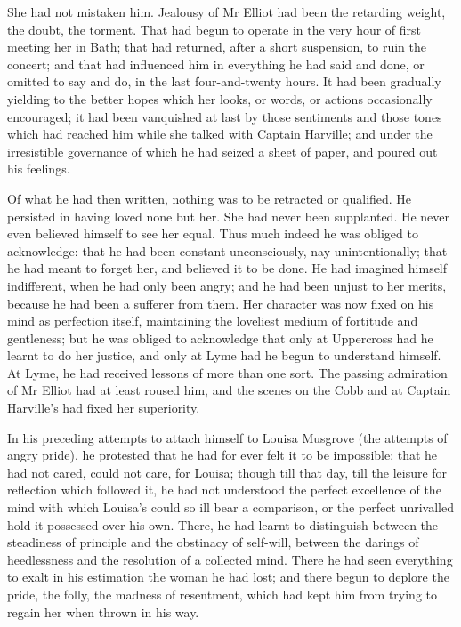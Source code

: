 She had not mistaken him. Jealousy of Mr Elliot had been the retarding weight, the doubt, the torment. That had begun to operate in the very hour of first meeting her in Bath; that had returned, after a short suspension, to ruin the concert; and that had influenced him in everything he had said and done, or omitted to say and do, in the last four-and-twenty hours. It had been gradually yielding to the better hopes which her looks, or words, or actions occasionally encouraged; it had been vanquished at last by those sentiments and those tones which had reached him while she talked with Captain Harville; and under the irresistible governance of which he had seized a sheet of paper, and poured out his feelings.

Of what he had then written, nothing was to be retracted or qualified. He persisted in having loved none but her. She had never been supplanted. He never even believed himself to see her equal. Thus much indeed he was obliged to acknowledge: that he had been constant unconsciously, nay unintentionally; that he had meant to forget her, and believed it to be done. He had imagined himself indifferent, when he had only been angry; and he had been unjust to her merits, because he had been a sufferer from them. Her character was now fixed on his mind as perfection itself, maintaining the loveliest medium of fortitude and gentleness; but he was obliged to acknowledge that only at Uppercross had he learnt to do her justice, and only at Lyme had he begun to understand himself. At Lyme, he had received lessons of more than one sort. The passing admiration of Mr Elliot had at least roused him, and the scenes on the Cobb and at Captain Harville's had fixed her superiority.

In his preceding attempts to attach himself to Louisa Musgrove (the attempts of angry pride), he protested that he had for ever felt it to be impossible; that he had not cared, could not care, for Louisa; though till that day, till the leisure for reflection which followed it, he had not understood the perfect excellence of the mind with which Louisa's could so ill bear a comparison, or the perfect unrivalled hold it possessed over his own. There, he had learnt to distinguish between the steadiness of principle and the obstinacy of self-will, between the darings of heedlessness and the resolution of a collected mind. There he had seen everything to exalt in his estimation the woman he had lost; and there begun to deplore the pride, the folly, the madness of resentment, which had kept him from trying to regain her when thrown in his way.

